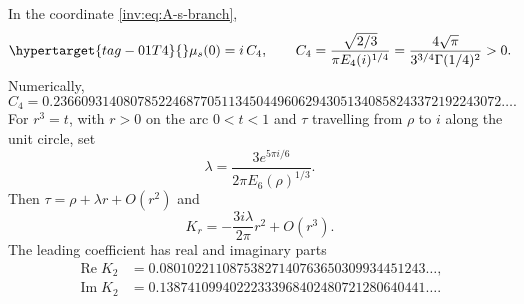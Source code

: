 \begin{proposition}\hypertarget{tag-01RV}{}\label{inv:A2.2}

In the coordinate \eqref{inv:eq:A-s-branch},
\begin{equation}\hypertarget{tag-01T4}{}\label{inv:eq:A-mu-value}
\mu_s(0)=i\,C_4,
\qquad
C_4=\frac{\sqrt{2/3}}{\pi E_4(i)^{1/4}}
=\frac{4\sqrt\pi}{3^{3/4}\Gamma(1/4)^2}>0.
\end{equation}
Numerically,
\[
C_4=0.2366093140807852246877051134504496062943051340858243372192243072\ldots.
\]
For $r^3=t$, with $r>0$ on the arc $0<t<1$ and $\tau$ travelling
from $\rho$ to $i$ along the unit circle, set
\[
\lambda=\frac{3e^{5\pi i/6}}{2\pi E_6(\rho)^{1/3}}.
\]
Then $\tau=\rho+\lambda r+O(r^2)$ and
\[
K_r=-\frac{3i\lambda}{2\pi}r^2+O(r^3).
\]
The leading coefficient has real and imaginary parts
\[
\begin{aligned}
\operatorname{Re}K_2&=0.08010221108753827140763650309934451243\ldots,\\
\operatorname{Im}K_2&=0.13874109940222333968402480721280640441\ldots.
\end{aligned}
\]
\end{proposition}


